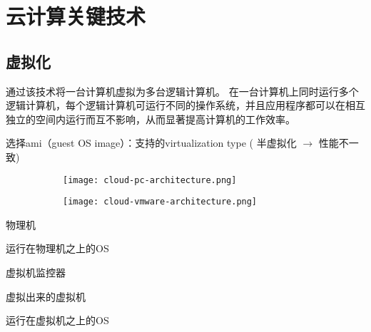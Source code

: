 \chapter{云计算关键技术}

\section{虚拟化}

\begin{definition}[虚拟化]
    通过该技术将一台计算机虚拟为多台逻辑计算机。 在一台计算机上同时运行多个逻辑计算机，每个逻辑计算机可运行不同的操作系统，并且应用程序都可以在相互独立的空间内运行而互不影响，从而显著提高计算机的工作效率。 
\end{definition}

\begin{example}[Amazon开启虚拟机]
    选择ami（guest OS image）：支持的virtualization type ( 半虚拟化 $\rightarrow$ 性能不一致)
\end{example}

\begin{figure}
    \centering
    \begin{subfigure}[b]{0.3 \textwidth}
        \centering
        \texttt{[image: cloud-pc-architecture.png]}
    \end{subfigure}
    \begin{subfigure}[b]{0.3 \textwidth}
        \centering
        \texttt{[image: cloud-vmware-architecture.png]}
    \end{subfigure}
\end{figure}

\begin{definition}
    物理机
\end{definition}

\begin{definition}[Host OS]
    运行在物理机之上的OS
\end{definition}

\begin{definition}
    虚拟机监控器
\end{definition}

\begin{definition}
    虚拟出来的虚拟机
\end{definition}

\begin{definition}[Guest OS]
    运行在虚拟机之上的OS
\end{definition}

